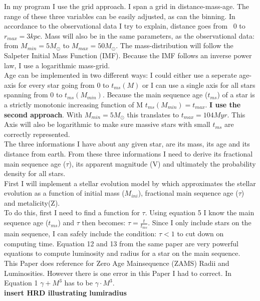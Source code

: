 \documentclass[a4paper,10pt]{article}
\begin{document}
 In my program I use the grid approach. I span a grid in distance-mass-age. The range of these three
 variables can be easily adjusted, as can the binning. In accordance to the observational data I try to explain, distance goes from \
 0 to $r_{max}=3kpc$. Mass will also be in the same parameters, as the observational data:
 from $M_{min}=5M_\odot$ to $M_{max}=50M_\odot$. The mass-distribution will follow the Salpeter Initial Mass Function (IMF)\citep[see][]{1955ApJ...121..161S}.
 Because the IMF follows an inverse power law, I use a logarithmic mass-grid.\\
 Age can be implemented in two different ways: I could either use a seperate age-axis for every star going from 0 to $t_{ms}(M)$ or I can
 use a single axis for all stars spanning from 0 to $t_{ms}(M_{min})$. Because the main sequence age ($t_{ms}$) of a star 
 is a strictly monotonic increasing function of M $t_{ms}(M_{min})=t_{max}$. \textbf{I use the second approach}. With $M_{min}=5M_\odot$ this 
 translates to $t_{max}=104Myr$. This Axis will also be logarithmic to make sure massive stars with small $t_{ms}$ are correctly
 represented. \\
 The three informations I have about any given star, are its mass, its age and its distance from earth. From these three informations
 I need to derive its fractional main sequence age ($\tau$), its apparent magnitude (V) and ultimately the probability density
 for all stars.\\ 
 First I will implement a stellar evolution model by \citet*{2000MNRAS.315..543H} which approximates the stellar evolution as a 
 function of initial mass ($M_{ini}$), fractional main sequence age ($\tau$) and metalicity(Z). \\
 To do this, first I need to find a function for $\tau$. Using equation 5 \citep[page 547]{2000MNRAS.315..543H} I know the main sequence age 
 ($t_{ms}$) and $\tau$ then becomes: $\tau=\frac{t}{t_{ms}}$. Since I only include stars on the main sequence, I can safely include
 the condition: $\tau<1$ to cut down on computing time.
 Equation 12 and 13 from the same paper are very powerful equations to compute luminosity and radius for a star on the main sequence.\\
 This Paper does reference \citet*{1996MNRAS.281..257T} for Zero Age Mainsequence (ZAMS) Radii and Luminosities. However there is one 
 error in this Paper I had to correct. In Equation 1 $\gamma + M^3$ has to be $\gamma \cdot M^3$.\\
 \textbf{insert HRD illustrating lumiradius}\\
 
\end{document}
